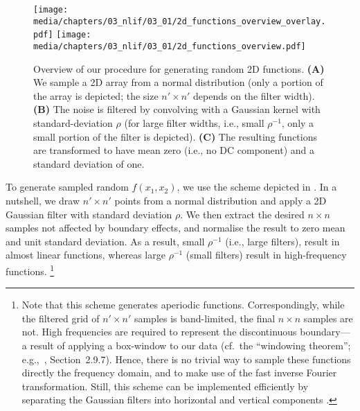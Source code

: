 \begin{figure}
	\texttt{[image: media/chapters/03\_nlif/03\_01/2d\_functions\_overview\_overlay.pdf]}%
	\kern-157.24mm\texttt{[image: media/chapters/03\_nlif/03\_01/2d\_functions\_overview.pdf]}
	\caption[Overview of our procedure for generating random 2D functions]{Overview of our procedure for generating random 2D functions. \textbf{(A)} We sample a 2D array from a normal distribution (only a portion of the array is depicted; the size $n' \times n'$ depends on the filter width). \textbf{(B)} The noise is filtered by convolving with a Gaussian kernel with standard-deviation $\rho$ (for large filter widths, i.e., small $\rho^{-1}$, only a small portion of the filter is depicted). \textbf{(C)} The resulting functions are transformed to have mean zero (i.e., no DC component) and a standard deviation of one.}
	\label{fig:2d_functions_overview}
\end{figure}

To generate sampled random $f(x_1, x_2)$, we use the scheme depicted in .
In a nutshell, we draw $n' \times n'$ points from a normal distribution and apply a 2D Gaussian filter with standard deviation $\rho$.
We then extract the desired $n \times n$ samples not affected by boundary effects, and normalise the result to zero mean and unit standard deviation.
As a result, small $\rho^{-1}$ (i.e., large filters), result in almost linear functions, whereas large $\rho^{-1}$ (small filters) result in high-frequency functions.%
\footnote{
Note that this scheme generates aperiodic functions.
Correspondingly, while the filtered grid of $n' \times n'$ samples is band-limited, the final $n \times n$ samples are not.
High frequencies are required to represent the discontinuous boundary---a result of applying a box-window to our data (cf.~the \enquote{windowing theorem}; e.g.,~\cite{oppenheim2009discretetime}, Section~2.9.7).
Hence, there is no trivial way to sample these functions directly the frequency domain, and to make use of the fast inverse Fourier transformation.
Still, this scheme can be implemented efficiently by separating the Gaussian filters into horizontal and vertical components \citep[e.g.][]{bolon2006twodimensional}.
}

